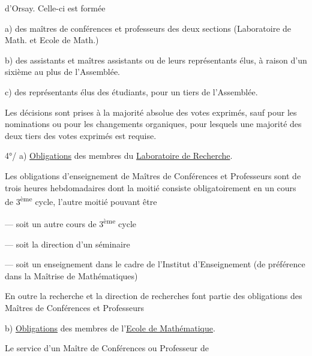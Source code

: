 
d'Orsay. Celle-ci est formée

a) des maîtres de conférences et professeurs des deux sections (Laboratoire de Math. et Ecole de Math.)

b) des assistants et maîtres assistants ou de leurs représentants élus, à raison d'un sixième au plus de l'Assemblée.

c) des représentants élus des étudiants, pour un tiers de l'Assemblée.

Les décisions sont prises à la majorité absolue des votes exprimés, sauf pour les nominations ou pour les changements organiques, pour lesquels une majorité des deux tiers des votes exprimés est requise.

4°/ a) \uline{Obligations} des membres du \uline{Laboratoire de Recherche}.

Les obligations d'enseignement de Maîtres de Conférences et Professeurs sont de trois heures hebdomadaires dont la moitié consiste obligatoirement en un cours de 3\textsuperscript{ème} cycle, l'autre moitié pouvant être

--- soit un autre cours de 3\textsuperscript{ème} cycle

--- soit la direction d'un séminaire

--- soit un enseignement dans le cadre de l'Institut d'Enseignement (de préférence dans la Maîtrise de Mathématiques)

En outre la recherche et la direction de recherches font partie des obligations des Maîtres de Conférences et Professeurs

b) \uline{Obligations} des membres de l'\uline{Ecole de Mathématique}.

Le service d'un Maître de Conférences ou Professeur de
